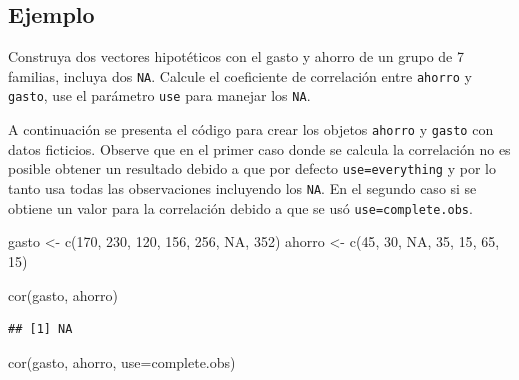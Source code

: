 \documentclass[
]{book}
\makeatletter
\newenvironment{Shaded}{\begin{snugshade}}{\end{snugshade}}
\newcommand{\AttributeTok}[1]{\textcolor[rgb]{0.77,0.63,0.00}{#1}}
\newcommand{\ConstantTok}[1]{\textcolor[rgb]{0.00,0.00,0.00}{#1}}
\newcommand{\DecValTok}[1]{\textcolor[rgb]{0.00,0.00,0.81}{#1}}
\newcommand{\FunctionTok}[1]{\textcolor[rgb]{0.00,0.00,0.00}{#1}}
\newcommand{\NormalTok}[1]{#1}
\newcommand{\OtherTok}[1]{\textcolor[rgb]{0.56,0.35,0.01}{#1}}
\newcommand{\StringTok}[1]{\textcolor[rgb]{0.31,0.60,0.02}{#1}}
\newenvironment{kframe}{%
\medskip{}
\setlength{\fboxsep}{.8em}
 \def\at@end@of@kframe{}%
 \ifinner\ifhmode%
  \def\at@end@of@kframe{\end{minipage}}%
  \begin{minipage}{\columnwidth}%
 \fi\fi%
 \def\FrameCommand##1{\hskip\@totalleftmargin \hskip-\fboxsep
 \colorbox{shadecolor}{##1}\hskip-\fboxsep
     \hskip-\linewidth \hskip-\@totalleftmargin \hskip\columnwidth}%
 \MakeFramed {\advance\hsize-\width
   \@totalleftmargin\z@ \linewidth\hsize
   \@setminipage}}%
 {\par\unskip\endMakeFramed%
 \at@end@of@kframe}
\renewenvironment{Shaded}{\begin{kframe}}{\end{kframe}}
\makeatother
\begin{document}
\hypertarget{ejemplo-46}{%
\subsection*{Ejemplo}\label{ejemplo-46}}

Construya dos vectores hipotéticos con el gasto y ahorro de un grupo de 7 familias, incluya dos \texttt{NA}. Calcule el coeficiente de correlación entre \texttt{ahorro} y \texttt{gasto}, use el parámetro \texttt{use} para manejar los \texttt{NA}.

A continuación se presenta el código para crear los objetos \texttt{ahorro} y \texttt{gasto} con datos ficticios. Observe que en el primer caso donde se calcula la correlación no es posible obtener un resultado debido a que por defecto \texttt{use=\textquotesingle{}everything\textquotesingle{}} y por lo tanto usa todas las observaciones incluyendo los \texttt{NA}. En el segundo caso si se obtiene un valor para la correlación debido a que se usó \texttt{use=\textquotesingle{}complete.obs\textquotesingle{}}.

\begin{Shaded}
\begin{Highlighting}[]
\NormalTok{gasto }\OtherTok{\textless{}{-}} \FunctionTok{c}\NormalTok{(}\DecValTok{170}\NormalTok{, }\DecValTok{230}\NormalTok{, }\DecValTok{120}\NormalTok{, }\DecValTok{156}\NormalTok{, }\DecValTok{256}\NormalTok{, }\ConstantTok{NA}\NormalTok{, }\DecValTok{352}\NormalTok{)}
\NormalTok{ahorro }\OtherTok{\textless{}{-}} \FunctionTok{c}\NormalTok{(}\DecValTok{45}\NormalTok{, }\DecValTok{30}\NormalTok{, }\ConstantTok{NA}\NormalTok{, }\DecValTok{35}\NormalTok{, }\DecValTok{15}\NormalTok{, }\DecValTok{65}\NormalTok{, }\DecValTok{15}\NormalTok{)}

\FunctionTok{cor}\NormalTok{(gasto, ahorro)}
\end{Highlighting}
\end{Shaded}

\begin{verbatim}
## [1] NA
\end{verbatim}

\begin{Shaded}
\begin{Highlighting}[]
\FunctionTok{cor}\NormalTok{(gasto, ahorro, }\AttributeTok{use=}\StringTok{\textquotesingle{}complete.obs\textquotesingle{}}\NormalTok{)}
\end{Highlighting}
\end{Shaded}
\end{document}
